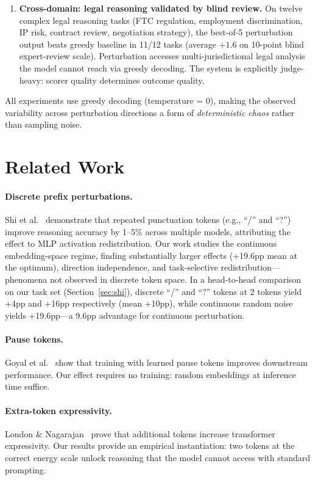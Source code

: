 \documentclass{article}
\begin{document}
\begin{enumerate}
    \item \textbf{Cross-domain: legal reasoning validated by blind review.}
    On twelve complex legal reasoning tasks (FTC regulation, employment
    discrimination, IP risk, contract review, negotiation strategy),
    the best-of-5 perturbation output beats greedy baseline in 11/12
    tasks (average $+1.6$ on 10-point blind expert-review
    scale). Perturbation accesses multi-jurisdictional legal analysis
    the model cannot reach via greedy decoding. The system is explicitly
    judge-heavy: scorer quality determines outcome quality.
\end{enumerate}

All experiments use greedy decoding (temperature = 0), making the
observed variability across perturbation directions a form of
\emph{deterministic chaos} rather than sampling noise.

\section{Related Work} %

\paragraph{Discrete prefix perturbations.}
Shi et al.~\cite{shi2025} demonstrate that repeated punctuation tokens
(e.g., ``/'' and ``?'') improve reasoning accuracy by 1--5\% across
multiple models, attributing the effect to MLP activation redistribution.
Our work studies the continuous embedding-space regime, finding
substantially larger effects (+19.6pp mean at the optimum), direction
independence, and task-selective redistribution---phenomena not observed
in discrete token space. In a head-to-head comparison on our task set
(Section~\ref{sec:shi}), discrete ``/'' and ``?'' tokens at 2 tokens
yield +4pp and +16pp respectively (mean +10pp), while continuous random
noise yields +19.6pp---a 9.6pp advantage for continuous perturbation.

\paragraph{Pause tokens.}
Goyal et al.~\cite{goyal2024} show that training with learned pause
tokens improves downstream performance. Our effect requires no training:
random embeddings at inference time suffice.

\paragraph{Extra-token expressivity.}
London \& Nagarajan~\cite{london2025} prove that additional tokens
increase transformer expressivity. Our results provide an empirical
instantiation: two tokens at the correct energy scale unlock reasoning
that the model cannot access with standard prompting.
\end{document}
